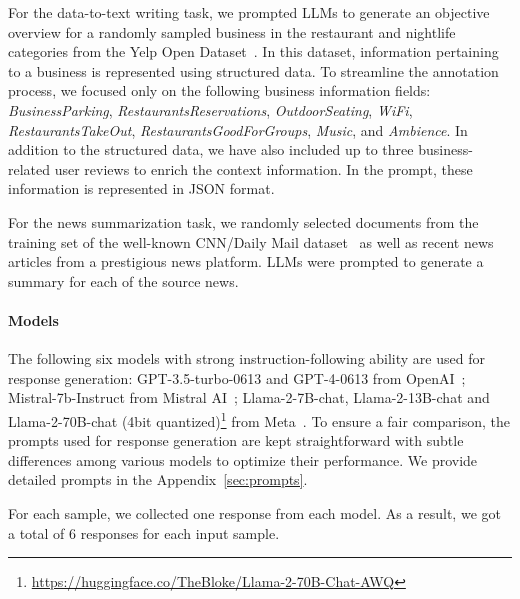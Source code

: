\documentclass[11pt]{article}
\begin{document}
For the data-to-text writing task, we prompted LLMs to generate an objective overview for a randomly sampled business in the restaurant and nightlife categories from the Yelp Open Dataset~\cite{yelp2023}.  
In this dataset, information pertaining to a business is represented using structured data.
To streamline the annotation process, we focused only on the following business information fields: \textit{BusinessParking}, \textit{RestaurantsReservations}, \textit{OutdoorSeating}, \textit{WiFi}, \textit{RestaurantsTakeOut}, \textit{RestaurantsGoodForGroups}, \textit{Music}, and \textit{Ambience}. 
In addition to the structured data, we have also included up to three business-related user reviews to enrich the context information.
In the prompt, these information is represented in JSON format.

For the news summarization task, we randomly selected documents from the training set of the well-known CNN/Daily Mail dataset~\cite{see-etal-2017get} as well as recent news articles from a prestigious news platform. 
LLMs were prompted to generate a summary for each of the source news.  

\paragraph{Models} 
The following six models with strong instruction-following ability are used for response generation: GPT-3.5-turbo-0613 and GPT-4-0613 from OpenAI~\cite{openai2023gpt4}; Mistral-7b-Instruct from Mistral AI~\cite{jiang2023mistral}; Llama-2-7B-chat, Llama-2-13B-chat and Llama-2-70B-chat (4bit quantized)\footnote{\url{https://huggingface.co/TheBloke/Llama-2-70B-Chat-AWQ}} from Meta~\cite{touvron2023llama}. To ensure a fair comparison, the prompts used for response generation are kept straightforward with subtle differences among various models to optimize their performance. We provide detailed prompts in the Appendix~\ref{sec:prompts}. 

For each sample, we collected one response from each model.
As a result, we got a total of 6 responses for each input sample.



\end{document}
